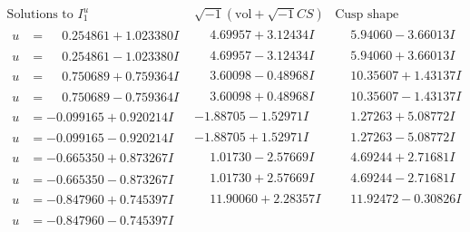 \documentclass[1p]{elsarticle_modified}
\theoremstyle{definition}
\newcommand{\I}{\sqrt{-1}}
\begin{document}
$$\begin{array}{c|c|c}  
\text{Solutions to }I^u_{1}& \I (\text{vol} + \sqrt{-1}CS) & \text{Cusp shape}\\
 \hline 
\begin{aligned}
u &= \phantom{-}0.254861 + 1.023380 I\end{aligned}
 & \phantom{-}4.69957 + 3.12434 I & \phantom{-}5.94060 - 3.66013 I \\ \hline\begin{aligned}
u &= \phantom{-}0.254861 - 1.023380 I\end{aligned}
 & \phantom{-}4.69957 - 3.12434 I & \phantom{-}5.94060 + 3.66013 I \\ \hline\begin{aligned}
u &= \phantom{-}0.750689 + 0.759364 I\end{aligned}
 & \phantom{-}3.60098 - 0.48968 I & \phantom{-}10.35607 + 1.43137 I \\ \hline\begin{aligned}
u &= \phantom{-}0.750689 - 0.759364 I\end{aligned}
 & \phantom{-}3.60098 + 0.48968 I & \phantom{-}10.35607 - 1.43137 I \\ \hline\begin{aligned}
u &= -0.099165 + 0.920214 I\end{aligned}
 & -1.88705 - 1.52971 I & \phantom{-}1.27263 + 5.08772 I \\ \hline\begin{aligned}
u &= -0.099165 - 0.920214 I\end{aligned}
 & -1.88705 + 1.52971 I & \phantom{-}1.27263 - 5.08772 I \\ \hline\begin{aligned}
u &= -0.665350 + 0.873267 I\end{aligned}
 & \phantom{-}1.01730 - 2.57669 I & \phantom{-}4.69244 + 2.71681 I \\ \hline\begin{aligned}
u &= -0.665350 - 0.873267 I\end{aligned}
 & \phantom{-}1.01730 + 2.57669 I & \phantom{-}4.69244 - 2.71681 I \\ \hline\begin{aligned}
u &= -0.847960 + 0.745397 I\end{aligned}
 & \phantom{-}11.90060 + 2.28357 I & \phantom{-}11.92472 - 0.30826 I \\ \hline\begin{aligned}
u &= -0.847960 - 0.745397 I\end{aligned}

\end{array}$$
\end{document}
